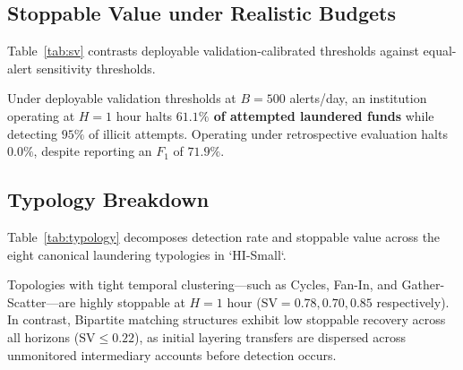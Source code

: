 \documentclass[10pt,twocolumn,letterpaper]{article}
\begin{document}
\subsection{Stoppable Value under Realistic Budgets}
Table~\ref{tab:sv} contrasts deployable validation-calibrated thresholds against equal-alert sensitivity thresholds.

\begin{table}[t]
\centering
\small
\caption{\textbf{Stoppable Value at Alert Budget $B=500$ alerts/day (`HI-Small').} Comparison of stoppable value ($\text{SV}$) and transfer share under deployable validation-calibrated thresholds versus equal-alert sensitivity thresholds.}
\label{tab:sv}
\resizebox{\textwidth}{!}{%
%
}
\end{table}

Under deployable validation thresholds at $B=500$ alerts/day, an institution operating at $H=1\text{ hour}$ halts \textbf{$61.1\%$ of attempted laundered funds} while detecting $95\%$ of illicit attempts. Operating under retrospective evaluation halts $0.0\%$, despite reporting an $F_1$ of $71.9\%$.

\subsection{Typology Breakdown}
Table~\ref{tab:typology} decomposes detection rate and stoppable value across the eight canonical laundering typologies in `HI-Small`.

\begin{table}[t]
\centering
\small
\caption{\textbf{Typology Decomposition of Detection Rate and Stoppable Value (`HI-Small').} Performance breakdown across canonical money laundering patterns under deployable validation thresholds at $B=500$ alerts/day across decision horizons.}
\label{tab:typology}
\resizebox{\textwidth}{!}{%
%
}
\end{table}

Topologies with tight temporal clustering—such as Cycles, Fan-In, and Gather-Scatter—are highly stoppable at $H=1\text{ hour}$ ($\text{SV} = 0.78, 0.70, 0.85$ respectively). In contrast, Bipartite matching structures exhibit low stoppable recovery across all horizons ($\text{SV} \le 0.22$), as initial layering transfers are dispersed across unmonitored intermediary accounts before detection occurs.
\end{document}
